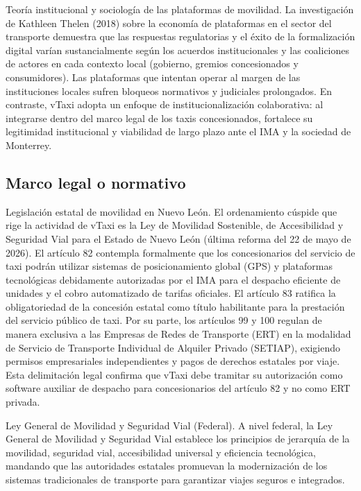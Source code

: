 {Teoría institucional y sociología de las plataformas de movilidad. La investigación de Kathleen Thelen (2018) sobre la economía de plataformas en el sector del transporte demuestra que las respuestas regulatorias y el éxito de la formalización digital varían sustancialmente según los acuerdos institucionales y las coaliciones de actores en cada contexto local (gobierno, gremios concesionados y consumidores). Las plataformas que intentan operar al margen de las instituciones locales sufren bloqueos normativos y judiciales prolongados. En contraste, vTaxi adopta un enfoque de institucionalización colaborativa: al integrarse dentro del marco legal de los taxis concesionados, fortalece su legitimidad institucional y viabilidad de largo plazo ante el IMA y la sociedad de Monterrey.


\subsection{Marco legal o normativo}
Legislación estatal de movilidad en Nuevo León. El ordenamiento cúspide que rige la actividad de vTaxi es la Ley de Movilidad Sostenible, de Accesibilidad y Seguridad Vial para el Estado de Nuevo León (última reforma del 22 de mayo de 2026). El artículo 82 contempla formalmente que los concesionarios del servicio de taxi podrán utilizar sistemas de posicionamiento global (GPS) y plataformas tecnológicas debidamente autorizadas por el IMA para el despacho eficiente de unidades y el cobro automatizado de tarifas oficiales. El artículo 83 ratifica la obligatoriedad de la concesión estatal como título habilitante para la prestación del servicio público de taxi. Por su parte, los artículos 99 y 100 regulan de manera exclusiva a las Empresas de Redes de Transporte (ERT) en la modalidad de Servicio de Transporte Individual de Alquiler Privado (SETIAP), exigiendo permisos empresariales independientes y pagos de derechos estatales por viaje. Esta delimitación legal confirma que vTaxi debe tramitar su autorización como software auxiliar de despacho para concesionarios del artículo 82 y no como ERT privada.


Ley General de Movilidad y Seguridad Vial (Federal). A nivel federal, la Ley General de Movilidad y Seguridad Vial establece los principios de jerarquía de la movilidad, seguridad vial, accesibilidad universal y eficiencia tecnológica, mandando que las autoridades estatales promuevan la modernización de los sistemas tradicionales de transporte para garantizar viajes seguros e integrados.


}
